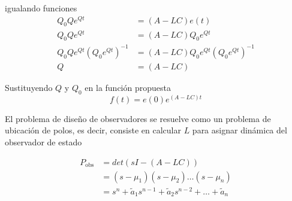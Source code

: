 igualando funciones
\[
    \begin{split}
        Q_{0}Qe^{Qt} & = (A-LC)e(t) \\
        Q_{0}Qe^{Qt} & = (A-LC)Q_{0}e^{Qt} \\
        Q_{0}Qe^{Qt}(Q_{0}e^{Qt})^{-1} & = (A-LC)Q_{0}e^{Qt}(Q_{0}e^{Qt})^{-1}\\
        Q & = (A-LC) 
    \end{split}
\]

Sustituyendo \( Q \) y \( Q_{0} \) en la función propuesta 
\[
    f(t) = e(0)e^{(A-LC)t}
\]

El problema de diseño de observadores se resuelve como un problema de ubicación de polos, es decir, consiste en calcular \( L \) para asignar dinámica del observador de estado

\[
    \begin{split}
        P_{\text{obs}} & = det(sI-(A-LC)) \\
        & = (s-\mu_{1})(s-\mu_{2})\ldots(s-\mu_{n}) \\
        & = s^{n} + \tilde{a}_{1}s^{n-1} + \tilde{a}_{2}s^{n-2} + \ldots + \tilde{a}_{n} 
    \end{split}
\]
